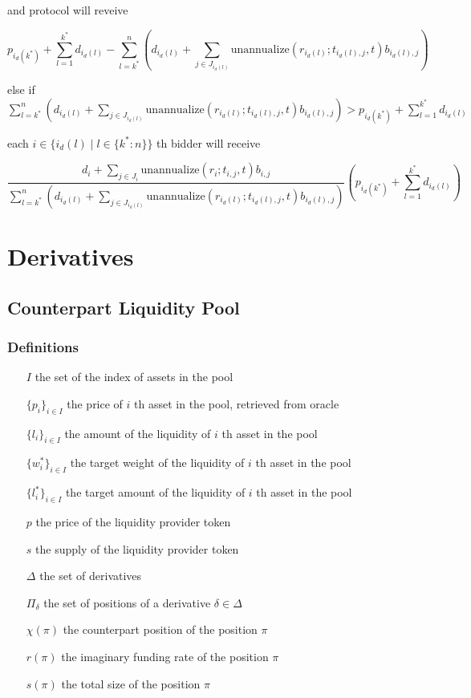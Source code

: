 \documentclass[dvipdfmx]{jsarticle}
\begin{document}
and protocol will reveive

$$
  p_{i_d(k^*)} + \sum_{l=1}^{k^*} d_{i_d(l)} - \sum_{l=k^*}^n \left(d_{i_d(l)} + \sum_{j \in J_{i_d(l)}} \text{unannualize}(r_{i_d(l)}; t_{i_d(l),j}, t) b_{i_d(l),j} \right)
$$

else if $\sum_{l=k^*}^n \left(d_{i_d(l)} + \sum_{j \in J_{i_d(l)}} \text{unannualize}(r_{i_d(l)}; t_{i_d(l),j}, t) b_{i_d(l),j} \right) > p_{i_d(k^*)} + \sum_{l=1}^{k^*} d_{i_d(l)}$

each $i \in \{i_d(l) \mid l \in \{k^*:n\}\}$ th bidder will receive

$$
  \frac{d_i + \sum_{j \in J_i} \text{unannualize}(r_i; t_{i,j}, t) b_{i,j}}{\sum_{l=k^*}^n \left(d_{i_d(l)} + \sum_{j \in J_{i_d(l)}} \text{unannualize}(r_{i_d(l)}; t_{i_d(l),j}, t) b_{i_d(l),j} \right)} \left( p_{i_d(k^*)} + \sum_{l=1}^{k^*} d_{i_d(l)} \right)
$$

\section{Derivatives}

\subsection{Counterpart Liquidity Pool}

\subsubsection{Definitions}

\begin{itemize}
  \item[$I$] the set of the index of assets in the pool
  \item[$\{p_i\}_{i \in I}$] the price of $i$ th asset in the pool, retrieved from oracle
  \item[$\{l_i\}_{i \in I}$] the amount of the liquidity of $i$ th asset in the pool
  \item[$\{w_i^*\}_{i \in I}$] the target weight of the liquidity of $i$ th asset in the pool
  \item[$\{l_i^*\}_{i \in I}$] the target amount of the liquidity of $i$ th asset in the pool
  \item[$p$] the price of the liquidity provider token
  \item[$s$] the supply of the liquidity provider token
  \item[$\Delta$] the set of derivatives 
  \item[$\Pi_\delta$] the set of positions of a derivative $\delta \in \Delta$
  \item[$\chi(\pi)$] the counterpart position of the position $\pi$
  \item[$r(\pi)$] the imaginary funding rate of the position $\pi$
  \item[$s(\pi)$] the total size of the position $\pi$
\end{itemize}
\end{document}
